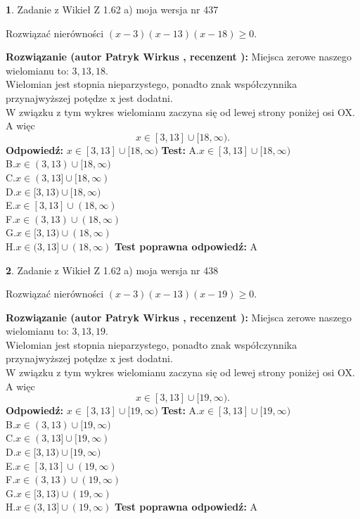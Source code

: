 \documentclass[12pt, a4paper]{article}
\theoremstyle{definition} %
\newtheorem{zad}{}
\newcommand{\zadStart}[1]{\begin{zad}#1\newline}
\newcommand{\zadStop}{\end{zad}}
\newcommand{\rozwStart}[2]{\noindent \textbf{Rozwiązanie (autor #1 , recenzent #2): }\newline}
\newcommand{\rozwStop}{\newline}
\newcommand{\odpStart}{\noindent \textbf{Odpowiedź:}\newline}
\newcommand{\odpStop}{\newline}
\newcommand{\testStart}{\noindent \textbf{Test:}\newline}
\newcommand{\testStop}{\newline}
\newcommand{\kluczStart}{\noindent \textbf{Test poprawna odpowiedź:}\newline}
\newcommand{\kluczStop}{\newline}
\begin{document}
\zadStart{Zadanie z Wikieł Z 1.62 a) moja wersja nr 437}

Rozwiązać nierówności $(x-3)(x-13)(x-18)\ge0$.
\zadStop
\rozwStart{Patryk Wirkus}{}
Miejsca zerowe naszego wielomianu to: $3, 13, 18$.\\
Wielomian jest stopnia nieparzystego, ponadto znak współczynnika przy\linebreak najwyższej potędze x jest dodatni.\\ W związku z tym wykres wielomianu zaczyna się od lewej strony poniżej osi OX. A więc $$x \in [3,13] \cup [18,\infty).$$
\rozwStop
\odpStart
$x \in [3,13] \cup [18,\infty)$
\odpStop
\testStart
A.$x \in [3,13] \cup [18,\infty)$\\
B.$x \in (3,13) \cup [18,\infty)$\\
C.$x \in (3,13] \cup [18,\infty)$\\
D.$x \in [3,13) \cup [18,\infty)$\\
E.$x \in [3,13] \cup (18,\infty)$\\
F.$x \in (3,13) \cup (18,\infty)$\\
G.$x \in [3,13) \cup (18,\infty)$\\
H.$x \in (3,13] \cup (18,\infty)$
\testStop
\kluczStart
A
\kluczStop



\zadStart{Zadanie z Wikieł Z 1.62 a) moja wersja nr 438}

Rozwiązać nierówności $(x-3)(x-13)(x-19)\ge0$.
\zadStop
\rozwStart{Patryk Wirkus}{}
Miejsca zerowe naszego wielomianu to: $3, 13, 19$.\\
Wielomian jest stopnia nieparzystego, ponadto znak współczynnika przy\linebreak najwyższej potędze x jest dodatni.\\ W związku z tym wykres wielomianu zaczyna się od lewej strony poniżej osi OX. A więc $$x \in [3,13] \cup [19,\infty).$$
\rozwStop
\odpStart
$x \in [3,13] \cup [19,\infty)$
\odpStop
\testStart
A.$x \in [3,13] \cup [19,\infty)$\\
B.$x \in (3,13) \cup [19,\infty)$\\
C.$x \in (3,13] \cup [19,\infty)$\\
D.$x \in [3,13) \cup [19,\infty)$\\
E.$x \in [3,13] \cup (19,\infty)$\\
F.$x \in (3,13) \cup (19,\infty)$\\
G.$x \in [3,13) \cup (19,\infty)$\\
H.$x \in (3,13] \cup (19,\infty)$
\testStop
\kluczStart
A
\kluczStop
\end{document}
